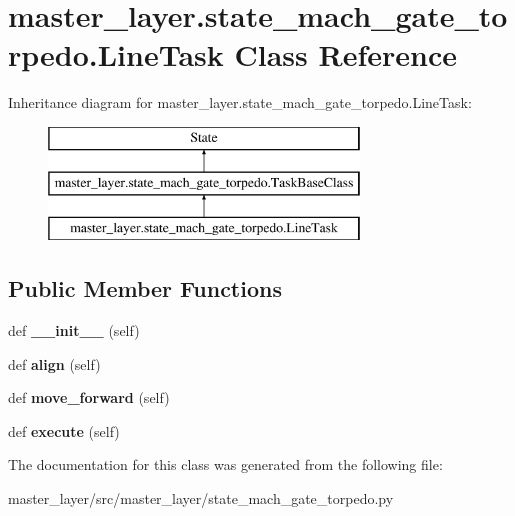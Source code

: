 \hypertarget{classmaster__layer_1_1state__mach__gate__torpedo_1_1LineTask}{}\section{master\+\_\+layer.\+state\+\_\+mach\+\_\+gate\+\_\+torpedo.\+Line\+Task Class Reference}
\label{classmaster__layer_1_1state__mach__gate__torpedo_1_1LineTask}
Inheritance diagram for master\+\_\+layer.\+state\+\_\+mach\+\_\+gate\+\_\+torpedo.\+Line\+Task\+:\begin{figure}[H]
\begin{center}
\leavevmode
\includegraphics[height=3.000000cm]{classmaster__layer_1_1state__mach__gate__torpedo_1_1LineTask}
\end{center}
\end{figure}
\subsection*{Public Member Functions}
\begin{DoxyCompactItemize}
\item 
\mbox{\label{classmaster__layer_1_1state__mach__gate__torpedo_1_1LineTask_a0ae0f1d37820462af30df2f51d2f84db}} 
def {\bfseries \+\_\+\+\_\+init\+\_\+\+\_\+} (self)
\item 
\mbox{\label{classmaster__layer_1_1state__mach__gate__torpedo_1_1LineTask_aad09c73e87d18f78195e75099450e07a}} 
def {\bfseries align} (self)
\item 
\mbox{\label{classmaster__layer_1_1state__mach__gate__torpedo_1_1LineTask_a7bc184fa92c7ef53995eba754bb26d23}} 
def {\bfseries move\+\_\+forward} (self)
\item 
\mbox{\label{classmaster__layer_1_1state__mach__gate__torpedo_1_1LineTask_ac83da84e3d44b5be3487f001203b647c}} 
def {\bfseries execute} (self)
\end{DoxyCompactItemize}


The documentation for this class was generated from the following file\+:\begin{DoxyCompactItemize}
\item 
master\+\_\+layer/src/master\+\_\+layer/state\+\_\+mach\+\_\+gate\+\_\+torpedo.\+py\end{DoxyCompactItemize}
